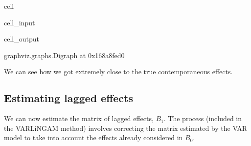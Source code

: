 \documentclass[letterpaper,10pt,english]{jupyterBook}
\begin{document}
\begin{sphinxuseclass}{cell}\begin{sphinxVerbatimInput}

\begin{sphinxuseclass}{cell_input}
\begin{sphinxVerbatim}[commandchars=\\\{\}]
  
 
\end{sphinxVerbatim}

\end{sphinxuseclass}\end{sphinxVerbatimInput}
\begin{sphinxVerbatimOutput}

\begin{sphinxuseclass}{cell_output}
\begin{sphinxVerbatim}[commandchars=\\\{\}]
\PYGZlt{}graphviz.graphs.Digraph at 0x168a8fed0\PYGZgt{}
\end{sphinxVerbatim}

\end{sphinxuseclass}\end{sphinxVerbatimOutput}

\end{sphinxuseclass}
\sphinxAtStartPar
We can see how we got extremely close to the true contemporaneous effects.


\subsection{Estimating lagged effects}
\label{\detokenize{notebooks/semiparametric_varlingam:estimating-lagged-effects}}
\sphinxAtStartPar
We can now estimate the matrix of lagged effects, \(B_1\). The process (included in the VARLiNGAM method) involves correcting the matrix estimated by the VAR model to take into account the effects already considered in \(B_0\).
\end{document}
